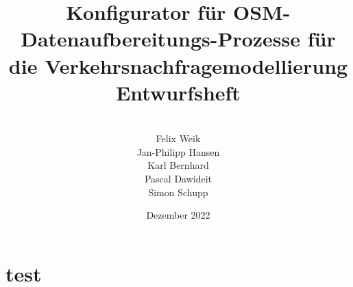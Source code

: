 \documentclass[parskip=full]{scrartcl} %
\title{Konfigurator für OSM-Datenaufbereitungs-Prozesse für die Verkehrsnachfragemodellierung \\ \vspace{2mm}\large{}Entwurfsheft}
\author{
\vspace{5mm}\\
Felix Weik\\ Jan-Philipp Hansen\\ Karl Bernhard\\ Pascal Dawideit\\ Simon Schupp}
\date{Dezember 2022}
\begin{document}
\maketitle
\newpage

\section{test}
\end{document}
